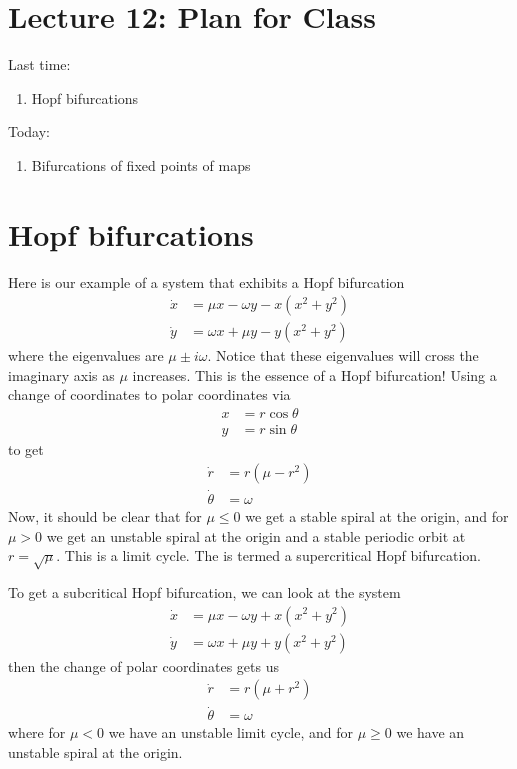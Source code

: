 \documentclass{article}
\begin{document}
\section{Lecture 12: Plan for Class}
Last time:
\begin{enumerate}
    \item Hopf bifurcations
\end{enumerate}

Today:
\begin{enumerate}
    \item Bifurcations of fixed points of maps
\end{enumerate}

\section{Hopf bifurcations}

Here is our example of a system that exhibits a Hopf bifurcation
\begin{align*}
    \dot{x}&= \mu x -\omega y - x \left(x^2 + y^2\right)\\
    \dot{y} &= \omega x + \mu y - y\left(x^2 + y^2\right)
\end{align*}
where the eigenvalues are $\mu\pm i\omega$. Notice that these eigenvalues will cross the imaginary axis as $\mu$ increases. This is the essence of a Hopf bifurcation! Using a change of coordinates to polar coordinates via 
\begin{align*}
    x &= r\cos\theta\\
    y & = r\sin\theta
\end{align*}
to get 
\begin{align*}
    \dot{r}&= r \left(\mu - r^2\right)\\
    \dot{\theta} &= \omega 
\end{align*}
Now, it should be clear that for $\mu\leq 0 $ we get a stable spiral at the origin, and for $\mu > 0$ we get an unstable spiral at the origin and a stable periodic orbit at $r=\sqrt{\mu}$. This is a limit cycle. The is termed a supercritical Hopf bifurcation.

To get a subcritical Hopf bifurcation, we can look at the system
\begin{align*}
    \dot{x}&= \mu x -\omega y + x \left(x^2 + y^2\right)\\
    \dot{y} &= \omega x + \mu y + y\left(x^2 + y^2\right)
\end{align*}
then the change of polar coordinates gets us 
\begin{align*}
    \dot{r}&= r \left(\mu + r^2\right)\\
    \dot{\theta} &= \omega 
\end{align*}
where for $\mu<0$ we have an unstable limit cycle, and for $\mu\geq 0$ we have an unstable spiral at the origin.
\end{document}
